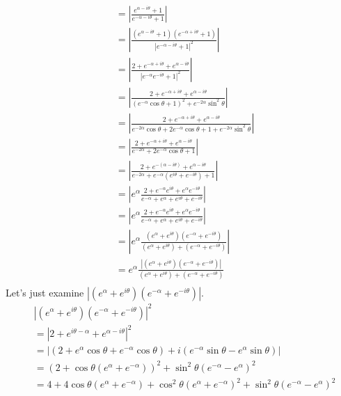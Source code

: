 \documentclass[12pt]{article}
\begin{document}
\begin{answer}
\begin{align*}
            &= \left|\frac{e^{\alpha-i\theta}+1}{e^{-\alpha-i\theta}+1}\right|\\
            &= \left|\frac{(e^{\alpha-i\theta}+1)(e^{-\alpha+i\theta}+1)}{|e^{-\alpha-i\theta}+1|^{2}}\right|\\
            &= \left|\frac{2+e^{-\alpha+i\theta}+e^{\alpha-i\theta}}{|e^{-\alpha}e^{-i\theta}+1|^{2}}\right|\\
            &= \left|\frac{2+e^{-\alpha+i\theta}+e^{\alpha-i\theta}}{(e^{-\alpha}\cos\theta+1)^{2}+e^{-2\alpha}\sin^{2}\theta}\right|\\
            &= \left|\frac{2+e^{-\alpha+i\theta}+e^{\alpha-i\theta}}{e^{-2\alpha}\cos\theta+2e^{-\alpha}\cos\theta+1+e^{-2\alpha}\sin^{2}\theta}\right|\\
            &= \left|\frac{2+e^{-\alpha+i\theta}+e^{\alpha-i\theta}}{e^{-2\alpha}+2e^{-\alpha}\cos\theta+1}\right|\\
            &= \left|\frac{2+e^{-(\alpha-i\theta)}+e^{\alpha-i\theta}}{e^{-2\alpha}+e^{-\alpha}(e^{i\theta}+e^{-i\theta})+1}\right|\\
            &= \left|e^{\alpha}\frac{2+e^{-\alpha}e^{i\theta}+e^{\alpha}e^{-i\theta}}{e^{-\alpha}+e^{\alpha}+e^{i\theta}+e^{-i\theta}}\right|\\
            &= \left|e^{\alpha}\frac{2+e^{-\alpha}e^{i\theta}+e^{\alpha}e^{-i\theta}}{e^{-\alpha}+e^{\alpha}+e^{i\theta}+e^{-i\theta}}\right|\\
            &= \left|e^{\alpha}\frac{(e^{\alpha}+e^{i\theta})(e^{-\alpha}+e^{-i\theta})}{(e^{\alpha}+e^{i\theta})+(e^{-\alpha}+e^{-i\theta})}\right|\\
            &= e^{\alpha}\frac{|(e^{\alpha}+e^{i\theta})(e^{-\alpha}+e^{-i\theta})|}{(e^{\alpha}+e^{i\theta})+(e^{-\alpha}+e^{-i\theta})}\\
        \end{align*}
        Let's just examine $|(e^{\alpha}+e^{i\theta})(e^{-\alpha}+e^{-i\theta})|$.
        \begin{align*}
            &|(e^{\alpha}+e^{i\theta})(e^{-\alpha}+e^{-i\theta})|^{2}\\
            &= |2+e^{i\theta-\alpha}+e^{\alpha-i\theta}|^{2}\\
            &= |(2 + e^{\alpha}\cos\theta + e^{-\alpha}\cos\theta) + i(e^{-\alpha}\sin\theta - e^{\alpha}\sin\theta)|\\
            &= (2 + \cos\theta(e^{\alpha} + e^{-\alpha}))^{2} + \sin^{2}\theta(e^{-\alpha} - e^{\alpha})^{2}\\
            &= 4 + 4\cos\theta(e^{\alpha}+e^{-\alpha}) + \cos^{2}\theta(e^{\alpha} + e^{-\alpha})^{2} + \sin^{2}\theta(e^{-\alpha} - e^{\alpha})^{2}\\

\end{align*}
\end{answer}
\end{document}
